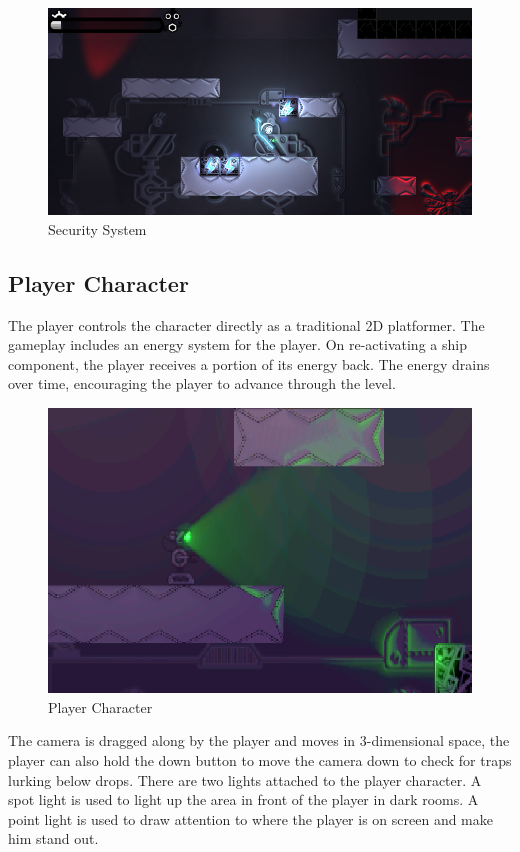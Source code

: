 \documentclass[11pt]{article}
\begin{document}
\begin{figure}
\centering
\includegraphics[width=\linewidth]{securitysystem.png}
\caption{Security System}\label{Fig:Data5}
\end{figure}
\subsection{Player Character}
The player controls the character directly as a traditional 2D platformer. The gameplay includes an energy system for the player. On re-activating a ship component, the player receives a portion of its energy back. The energy drains over time, encouraging the player to advance through the level.\\

\begin{figure}
\centering
\includegraphics[scale = 0.5]{robot.png}
\caption{Player Character}\label{Fig:Data6}
\end{figure}

The camera is dragged along by the player and moves in 3-dimensional space, the player can also hold the down button to move the camera down to check for traps lurking below drops. There are two lights attached to the player character. A spot light is used to light up the area in front of the player in dark rooms. A point light is used to draw attention to where the player is on screen and make him stand out.
\end{document}
